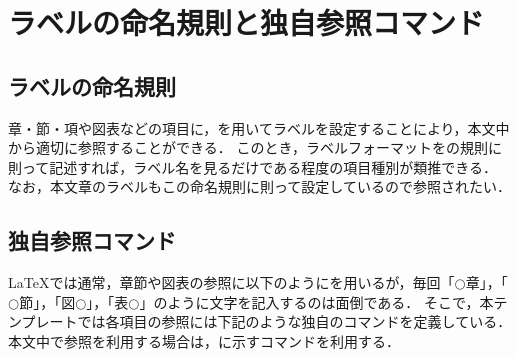 \documentclass[a4j,11pt]{ujreport}
\begin{document}
\section{ラベルの命名規則と独自参照コマンド}

\subsection{ラベルの命名規則}
章・節・項や図表などの項目に，を用いてラベルを設定することにより，本文中から適切に参照することができる．
このとき，ラベルフォーマットをの規則に則って記述すれば，ラベル名を見るだけである程度の項目種別が類推できる．
なお，本文章のラベルもこの命名規則に則って設定しているので参照されたい．

\subsection{独自参照コマンド}
{\LaTeX}では通常，章節や図表の参照に以下のようにを用いるが，毎回「$\bigcirc$章」，「$\bigcirc$節」，「図$\bigcirc$」，「表$\bigcirc$」のように文字を記入するのは面倒である．
そこで，本テンプレートでは各項目の参照には下記のような独自のコマンドを定義している．
本文中で参照を利用する場合は，に示すコマンドを利用する．
\end{document}
